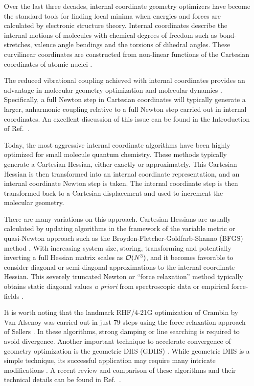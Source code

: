 \documentclass[prl,twocolumn,showpacs,twocolumngrid,superbib]{revtex4}
\begin{document}
Over the last three decades, internal coordinate geometry optimizers have become the standard 
tools for finding local minima when energies and forces are calculated by electronic structure 
theory. Internal coordinates describe the internal motions of molecules 
with chemical degrees of freedom such as bond-stretches, valence angle bendings and the torsions 
of dihedral angles. These curvilinear coordinates are constructed from non-linear functions of the 
Cartesian coordinates of atomic nuclei \cite{wilson}.

The reduced vibrational coupling achieved with internal coordinates provides an advantage 
in molecular geometry optimization \cite{pulay_review} and molecular dynamics \cite{pulay_dynamics}.
Specifically, a full Newton step in Cartesian coordinates will typically generate a larger, 
anharmonic coupling relative to a full Newton step carried out in internal coordinates.
An excellent discussion of this issue can be found in the Introduction of Ref.~.

Today, the most aggressive internal coordinate algorithms have been highly optimized for 
small molecule quantum chemistry.  These methods typically generate a Cartesian Hessian,
either exactly or approximately. This Cartesian Hessian is then transformed into an internal 
coordinate representation, and an internal coordinate Newton step is taken. The internal 
coordinate step is then transformed back to a Cartesian displacement and used to increment the 
molecular geometry.

There are many variations on this approach.  Cartesian Hessians are usually calculated by updating 
algorithms in the framework of the variable metric or quasi-Newton approach such as the  
Broyden-Fletcher-Goldfarb-Shanno (BFGS) method \cite{RFletcher}.  With increasing system size, storing,
transforming and potentially inverting a full Hessian matrix scales as ${\cal O}(N^3)$, and it becomes
favorable to consider diagonal or semi-diagonal approximations to the internal coordinate Hessian. 
This severely truncated Newton or  ``force relaxation'' method typically obtains static diagonal values 
{\em a priori} from spectroscopic data or empirical force-fields 
\cite{pulay_69,fogarasi_diaghess,Pulay_natural_internals,pulay_review,sellers,van_alsenoy_98,lindh}.

It is worth noting that the landmark RHF/4-21G optimization of Crambin by Van Alsenoy \cite{van_alsenoy_98}
was carried out in just 79 steps using the force relaxation approach of Sellers \cite{sellers}.
In these algorithms, strong damping \cite{sellers} or line searching \cite{sclegel_linesearch}
is required to avoid divergence. Another important technique to accelerate convergence of 
geometry optimization is the geometric DIIS (GDIIS) \cite{Pulay_GDIIS}. While geometric DIIS is a simple 
technique, its successful application may require many intricate modifications \cite{Farkas_GDIIS}.  A 
recent review and comparison of these algorithms and their technical details can be found in 
Ref.~.  
\end{document}
